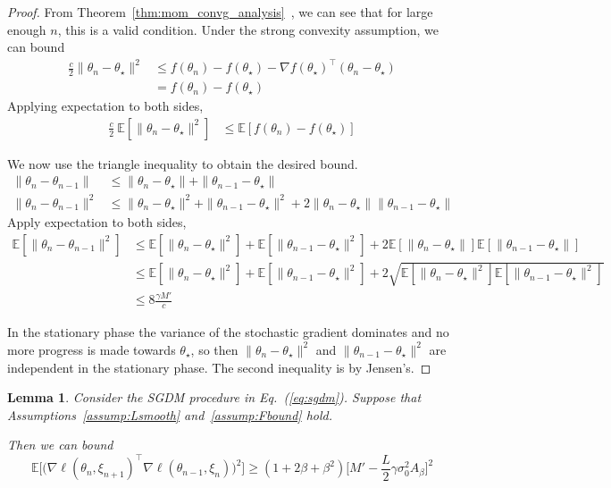 \documentclass[conference]{IEEEtran}
\newcommand{\Ex}[1]{\mathbb{E}[ #1 ]}
\newtheorem{lemma}[theorem]{Lemma}
\begin{document}
\begin{proof}
From Theorem~\ref{thm:mom_convg_analysis}~\cite{Report:Yang_arXiv16}, we can see that for large enough $n$, this is a valid condition.
Under the strong convexity assumption, we can bound
\begin{align*}
\frac{c}{2} \| \theta_n - \theta_\star \|^2 &\leq f ( \theta_n ) - f ( \theta_\star ) - \nabla f ( \theta_\star )^\top ( \theta_n - \theta_\star ) \\
&= f ( \theta_n ) - f ( \theta_\star ) 
\end{align*}
Applying expectation  to both sides,
\begin{align*}
\frac{c}{2} \ \Ex{ \| \theta_n - \theta_\star \|^2 } &\leq \Ex{ f ( \theta_n ) - f ( \theta_\star ) }
\end{align*}

We now use the triangle inequality  to obtain the desired bound.
\begin{align*}
\| \theta_n - \theta_{n-1} \| &\leq \| \theta_n - \theta_\star \|  + \| \theta_{n-1} - \theta_\star \| \\
\| \theta_n - \theta_{n-1} \|^2 &\leq \| \theta_n - \theta_\star \|^2  + \| \theta_{n-1} - \theta_\star \|^2 + 2 \| \theta_n - \theta_\star \| \| \theta_{n-1} - \theta_\star \|
\end{align*}
Apply expectation to both sides,
\begin{align*}
\Ex{ \| \theta_n - \theta_{n-1} \|^2 } 
&\leq \Ex{ \| \theta_n - \theta_\star \|^2 } + \Ex{ \| \theta_{n-1} - \theta_\star \|^2 } + 2 \Ex{ \| \theta_n - \theta_\star \| } \Ex{ \| \theta_{n-1} - \theta_\star \| } \\
&\leq \Ex{ \| \theta_n - \theta_\star \|^2 } + \Ex{ \| \theta_{n-1} - \theta_\star \|^2 } + 2 \sqrt{ \Ex{ \| \theta_n - \theta_\star \|^2 } \Ex{ \| \theta_{n-1} - \theta_\star \|^2 } }\\
&\leq 8 \frac{ \gamma M' }{ c }
\end{align*}


In the stationary phase the variance of the stochastic gradient dominates and no more progress is made towards $\theta_\star$, so then $\| \theta_n - \theta_\star \|^2$ and $\| \theta_{n-1} - \theta_\star \|^2$ are independent in the stationary phase.
The second inequality is by Jensen's.
\end{proof}

\newpage

\begin{lemma}
\label{lemma:exp_ip_sq_lower}
Consider the SGDM procedure in Eq.~(\ref{eq:sgdm}).  
Suppose that Assumptions~\ref{assump:Lsmooth} and~\ref{assump:Fbound} hold.

Then we can bound
\begin{equation*}
\mathbb{E}\biggl[ \biggl( \nabla \ell ( \theta_n, \xi_{n+1} )^\top \nabla \ell ( \theta_{n-1}, \xi_n ) \biggr)^2 \biggr] 
\geq ( 1 + 2 \beta + \beta^2 ) \biggl[ M' - \frac{L}{2} \gamma \sigma_0^2 A_\beta \biggr]^2 
\end{equation*}
\end{lemma}
\end{document}
